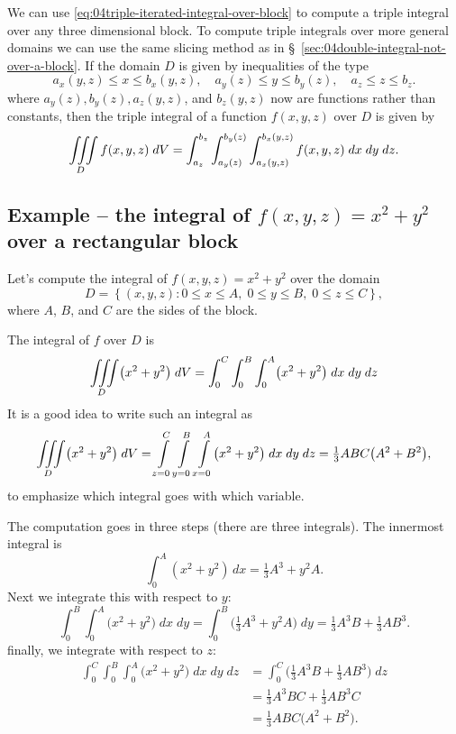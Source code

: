 We can use \eqref{eq:04triple-iterated-integral-over-block} to compute a triple integral over any three dimensional block.  To compute triple integrals over more general domains we can use the same slicing method as in \S~\ref{sec:04double-integral-not-over-a-block}.
If the domain $D$ is given by inequalities of the type
\begin{equation}\label{eq:04general-domain-3D}
  a_x(y,z)\le x\le b_x(y,z),\quad
  a_y(z)\le y\le b_y(z),\quad
  a_z\le z\le b_z.
\end{equation}
where $a_y(z), b_y(z), a_z(y,z)$, and $b_z(y,z)$ now are functions
rather than constants, then the triple integral of a function
$f(x, y, z)$ over $D$ is given by
\[
\iiint\limits_D f(x, y, z) \; dV  
=
\int_{a_z}^{b_z} 
\int_{a_y(z)}^{b_y(z)} 
\int_{a_x(y,z)}^{b_x(y,z)} 
f(x, y, z) \; dx\; dy\; dz.
\]


\subsection{Example -- the integral of $f(x, y, z)=x^2+y^2$ over  
a rectangular block}\label{sec:04int-of-x2y2-over-block}
Let's compute the integral of $f(x, y, z) = x^2+y^2$ over the domain 
\[
D = \left\{ (x,y,z) : 0\le x\le A,\;  0\le y\le B,\;  0\le z\le C \right\},
\]
where $A$, $B$, and $C$ are the sides of the block.

The integral of $f$ over $D$ is
\[
\iiint\limits_D \bigl(x^2+y^2\bigr)\;  dV
= \int_0^C  \int_0^B  \int_0^A  \bigl(x^2+y^2\bigr)\;  dx\; dy\; dz
\]
It is a good idea to write such an integral as
\[
\iiint\limits_D \bigl(x^2+y^2\bigr)\;  dV
= \int\limits_{z=0}^C  
\int\limits_{y=0}^B  \int\limits_{x=0}^A
\bigl(x^2+y^2\bigr)\;  dx\; dy\; dz
= \tfrac13 ABC \bigl(A^2 + B^2\bigr),
\]
to emphasize which integral goes with which variable.

The computation goes in three steps (there are three integrals).
The innermost integral is
\[
 \int_0^A (x^2+y^2)\, dx
 =
 \tfrac13 A^3 + y^2A.
\]
Next we integrate this with respect to $y$:
\[
  \int_0^B  \int_0^A  \bigl(x^2+y^2\bigr)\;  dx\; dy
  =\int_0^B \bigl(\tfrac13A^3 + y^2A\bigr)\; dy
  = \tfrac13 A^3B + \tfrac13 AB^3.
\]
finally, we integrate with respect to $z$:
\begin{align*}
  \int_0^C  \int_0^B  \int_0^A  \bigl(x^2+y^2\bigr)\;  dx\; dy\; dz
  &=\int_0^C \bigl(\tfrac13 A^3B + \tfrac13 AB^3\bigr) \; dz \\
  &=\tfrac13A^3BC+\tfrac13AB^3C\\
  &= \tfrac13 ABC \bigl(A^2 + B^2\bigr).
\end{align*}

